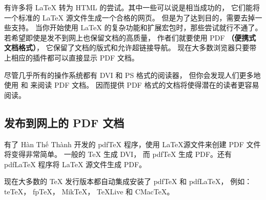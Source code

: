 有许多将 \LaTeX{} 转为 HTML 的尝试。其中一些可以说是相当成功的，
它们能将一个标准的 \LaTeX{} 源文件生成一个合格的网页。
但是为了达到目的，需要去掉一些支持。
当你开始使用 \LaTeX{} 的复杂功能和扩展宏包时，那些尝试就行不通了。
若希望即使是发不到网上也保留文档的高质量，
作者们就要使用 PDF \textbf{（便携式文档格式）}，
它保留了文档的版式和允许超链接导航。
现在大多数浏览器只要带上相应的插件都可以直接显示 PDF 文档。


尽管几乎所有的操作系统都有 DVI 和 PS 格式的阅读器，
但你会发现人们更多地使用  和  来阅读 PDF 文档。
因而提供 PDF 格式的文档将使得潜在的读者更容易阅读。


\subsection{发布到网上的 PDF 文档}


有了 H\`an Th\'{\^e} Th\`anh 开发的 pdf\TeX{} 程序，使用 \LaTeX 源文件来创建 PDF 文件将变得非常简单。
一般的 TeX{} 生成 DVI，
而 pdf\TeX{} 生成 PDF。还有 pdf\LaTeX{} 程序将 LaTeX{} 源文件生成 PDF。


现在大多数的 \TeX{} 发行版本都自动集成安装了 pdf\TeX{} 和 pdf\LaTeX{}，
例如： te\TeX{}， fp\TeX{}， Mik\TeX{}， \TeX{}Live 和 CMac\TeX{}。


